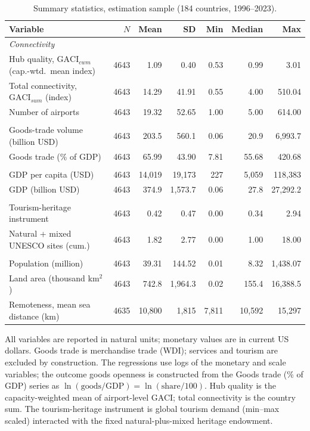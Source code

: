 \begin{table}[H]
\centering
\caption{Summary statistics, estimation sample (184 countries, 1996--2023).}
\label{tab:sumstat}
\begin{threeparttable}
\small
\begin{tabular}{lrrrrrr}
\toprule
Variable & $N$ & Mean & SD & Min & Median & Max \\
\midrule
\multicolumn{7}{l}{\emph{Connectivity}}\\
Hub quality, $\mathrm{GACI}_{cwm}$ (cap.-wtd.\ mean index) & 4643 & 1.09 & 0.40 & 0.53 & 0.99 & 3.01 \\
Total connectivity, $\mathrm{GACI}_{sum}$ (index) & 4643 & 14.29 & 41.91 & 0.55 & 4.00 & 510.04 \\
Number of airports & 4643 & 19.32 & 52.65 & 1.00 & 5.00 & 614.00 \\
\addlinespace
\multicolumn{7}{l}{\emph{Trade outcomes}}\\
Goods-trade volume (billion USD) & 4643 & 203.5 & 560.1 & 0.06 & 20.9 & 6{,}993.7 \\
Goods trade (\% of GDP) & 4643 & 65.99 & 43.90 & 7.81 & 55.68 & 420.68 \\
\addlinespace
\multicolumn{7}{l}{\emph{Income}}\\
GDP per capita (USD) & 4643 & 14{,}019 & 19{,}173 & 227 & 5{,}059 & 118{,}383 \\
GDP (billion USD) & 4643 & 374.9 & 1{,}573.7 & 0.06 & 27.8 & 27{,}292.2 \\
\addlinespace
\multicolumn{7}{l}{\emph{Instrument and heritage}}\\
Tourism-heritage instrument & 4643 & 0.42 & 0.47 & 0.00 & 0.34 & 2.94 \\
Natural + mixed UNESCO sites (cum.) & 4643 & 1.82 & 2.77 & 0.00 & 1.00 & 18.00 \\
\addlinespace
\multicolumn{7}{l}{\emph{Controls}}\\
Population (million) & 4643 & 39.31 & 144.52 & 0.01 & 8.32 & 1{,}438.07 \\
Land area (thousand km$^2$) & 4643 & 742.8 & 1{,}964.3 & 0.02 & 155.4 & 16{,}388.5 \\
Remoteness, mean sea distance (km) & 4635 & 10{,}800 & 1{,}815 & 7{,}811 & 10{,}592 & 15{,}297 \\
\bottomrule
\end{tabular}
\begin{tablenotes}\small
\item All variables are reported in natural units; monetary values are in
current US dollars. Goods trade is merchandise trade (WDI); services and
tourism are excluded by construction. The regressions use logs of the
monetary and scale variables; the outcome goods openness is constructed from
the Goods trade (\% of GDP) series as
$\ln(\text{goods}/\text{GDP})=\ln(\text{share}/100)$. Hub quality is the
capacity-weighted mean of airport-level
GACI; total connectivity is the country sum. The tourism-heritage instrument is
global tourism demand (min--max scaled) interacted with the fixed
natural-plus-mixed heritage endowment.
\end{tablenotes}
\end{threeparttable}
\end{table}


